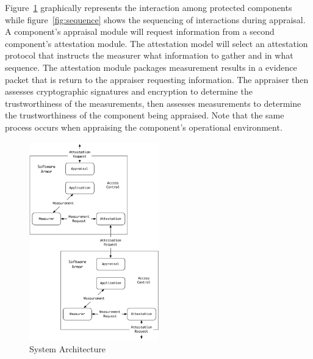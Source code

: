 \documentclass[10pt]{article}
\begin{document}
Figure~\ref{fig:system} graphically represents the interaction among
protected components while figure~\ref{fig:sequence} shows the
sequencing of interactions during appraisal.  A component's appraisal
module will request information from a second component's attestation
module.  The attestation model will select an attestation protocol
that instructs the measurer what information to gather and in what
sequence.  The attestation module packages measurement results in a
evidence packet that is return to the appraiser requesting
information.  The appraiser then assesses cryptographic signatures and
encryption to determine the trustworthiness of the measurements, then
assesses measurements to determine the trustworthiness of the
component being appraised.  Note that the same process occurs when
appraising the component's operational environment.

\begin{figure}[hbtp]
  \centering
  \includegraphics[width=0.5\textwidth]{figures/system.pdf}
  \caption{System Architecture}
  \label{fig:system}
\end{figure}
\end{document}
